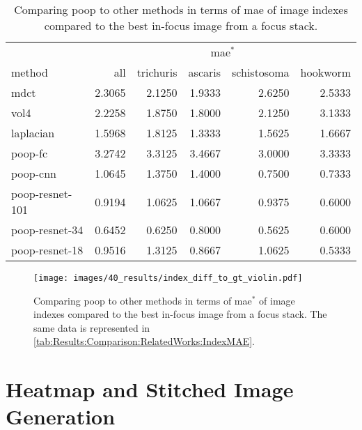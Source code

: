 \begin{table}
    \centering
    \caption{Comparing \acs{poop} to other methods in terms of \ac{mae} of image indexes compared to the best in-focus image from a focus stack.}
    \begin{tabular}{|l|rrrrr|}
        \hline
        \multicolumn{1}{|c}{} & \multicolumn{5}{|c|}{\ac{mae}$^*$} \\
        method & all & trichuris & ascaris & schistosoma & hookworm \\
        \hline
        \acs{mdct}      & 2.3065 & 2.1250 & 1.9333 & 2.6250 & 2.5333 \\
        \acs{vol4}      & 2.2258 & 1.8750 & 1.8000 & 2.1250 & 3.1333 \\
        \acs{laplacian} & 1.5968 & 1.8125 & 1.3333 & 1.5625 & 1.6667 \\
        \hline
        \acs{poop}-\acs{fc}  & 3.2742 & 3.3125 & 3.4667 & 3.0000 & 3.3333 \\
        \acs{poop}-\acs{cnn}            & 1.0645 & 1.3750 & 1.4000 & 0.7500 & 0.7333 \\
        \acs{poop}-\acs{resnet}-101      & 0.9194 & 1.0625 & 1.0667 & 0.9375 & 0.6000 \\
        \acs{poop}-\acs{resnet}-34       & 0.6452 & 0.6250 & 0.8000 & 0.5625 & 0.6000 \\
        \acs{poop}-\acs{resnet}-18       & 0.9516 & 1.3125 & 0.8667 & 1.0625 & 0.5333 \\
        \hline
    \end{tabular}
    \label{tab:Results:Comparison:RelatedWorks:IndexMAE}
\end{table}

\begin{figure}
    \centering
    \texttt{[image: images/40\_results/index\_diff\_to\_gt\_violin.pdf]}
    \caption{Comparing \acs{poop} to other methods in terms of \ac{mae}$^*$ of image indexes compared to the best in-focus image from a focus stack. The same data is represented in \autoref{tab:Results:Comparison:RelatedWorks:IndexMAE}.}
    \label{fig:Results:Comparison:RelatedWorks:IndexMAE}
\end{figure}


\section{Heatmap and Stitched Image Generation}
\label{sec:Results:HeatStiched}

